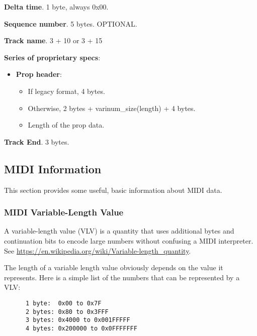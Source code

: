    \begin{enumber}
      \item \textbf{Delta time}.  1 byte, always 0x00.
      \item \textbf{Sequence number}.  5 bytes.  OPTIONAL.
      \item \textbf{Track name}. 3 + 10 or 3 + 15
      \item \textbf{Series of proprietary specs}:
      \begin{itemize}
         \item \textbf{Prop header}:
         \begin{itemize}
            \item If legacy format, 4 bytes.
            \item Otherwise, 2 bytes + varinum\_size(length) + 4 bytes.
            \item Length of the prop data.
         \end{itemize}
      \end{itemize}
      \item \textbf{Track End}. 3 bytes.
   \end{enumber}

\subsection{MIDI Information}
\label{subsec:midi_information}

   This section provides some useful, basic information about MIDI data.

\subsubsection{MIDI Variable-Length Value}
\label{subsubsec:midi_variable_length_value}

   A variable-length value (VLV) is a quantity that uses additional bytes
   and continuation bits to encode large numbers without confusing a MIDI
   interpreter.
   See \url{https://en.wikipedia.org/wiki/Variable-length\_quantity}.

   The length of a variable length value obviously depends on the value it
   represents.  Here is a simple list of the numbers that can be represented
   by a VLV:

   \begin{verbatim}
      1 byte:  0x00 to 0x7F
      2 bytes: 0x80 to 0x3FFF
      3 bytes: 0x4000 to 0x001FFFFF
      4 bytes: 0x200000 to 0x0FFFFFFF
   \end{verbatim}

